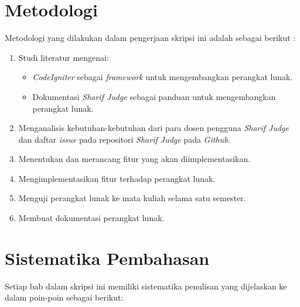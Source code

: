 \section{Metodologi}
\label{sec:metlit}Metodologi yang dilakukan dalam pengerjaan skripsi ini adalah sebagai berikut :

\begin{enumerate}
	\item Studi literatur mengenai:
		\begin{itemize}
			\item \textit{CodeIgniter} sebagai \textit{framework} untuk mengembangkan perangkat lunak.
			\item Dokumentasi \textit{Sharif Judge} sebagai panduan untuk mengembangkan perangkat lunak.
		\end{itemize}
	\item Menganalisis kebutuhan-kebutuhan dari para dosen pengguna \textit{Sharif Judge} dan daftar \textit{issue} pada repositori \textit{Sharif Judge} pada \textit{Github}.
	\item Menentukan dan merancang fitur yang akan diimplementasikan.
	\item Mengimplementasikan fitur terhadap perangkat lunak.
	\item Menguji perangkat lunak ke mata kuliah selama satu semester.
	\item Membuat dokumentasi perangkat lunak.
\end{enumerate}

\section{Sistematika Pembahasan}
\label{sec:sispem}
Setiap bab dalam skripsi ini memiliki sistematika penulisan yang dijelaskan ke dalam poin-poin sebagai berikut:

